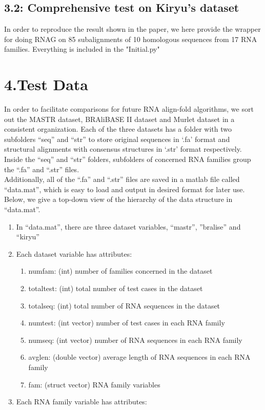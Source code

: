\documentclass{article}
\begin{document}
\begin{spacing}{1.1}
\subsection{3.2: Comprehensive test on Kiryu's dataset}
In order to reproduce the result shown in the paper, 
we here provide the wrapper for doing RNAG on 85 subalignments of 10 homologous sequences from 17 RNA families.
Everything is included in the "Initial.py"
\section{4.Test Data}
In order to facilitate comparisons for future RNA align-fold algorithms, we sort out the MASTR dataset, BRAliBASE II dataset and Murlet dataset in a consistent organization. Each of the three datasets has a folder with two subfolders “seq” and “str” to store original sequences in ‘.fa’ format and structural alignments with consensus structures in ‘.str’ format respectively. Inside the “seq” and “str” folders, subfolders of concerned RNA families group the “.fa” and “.str” files.\\
Additionally, all of the “.fa” and “.str” files are saved in a matlab file called “data.mat”, which is easy to load and output in desired format for later use. Below, we give a top-down view of the hierarchy of the data structure in “data.mat”.
\begin{enumerate}
\item In “data.mat”, there are three dataset variables, “mastr”, ”bralise” and “kiryu” 
\item Each dataset variable has attributes: 
\begin{enumerate}
\item numfam: (int) number of families concerned in the dataset
\item totaltest: (int) total number of test cases in the dataset
\item totalseq: (int) total number of RNA sequences in the dataset
\item numtest: (int vector) number of test cases in each RNA family
\item numseq: (int vector) number of RNA sequences in each RNA family
\item avglen: (double vector) average length of RNA sequences in each RNA family
\item fam: (struct vector) RNA family variables
\end{enumerate}
\item Each RNA family variable has attributes: 
\begin{enumerate}

\end{enumerate}
\end{enumerate}
\end{spacing}
\end{document}
